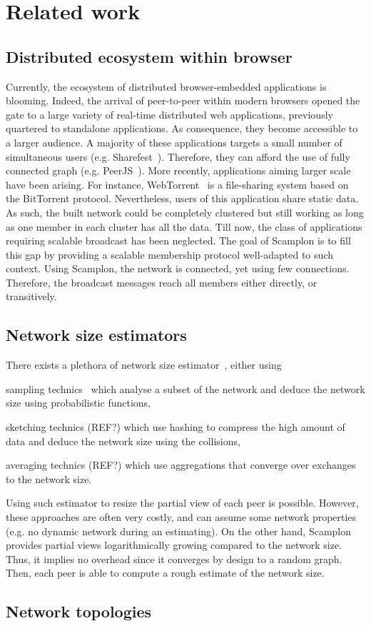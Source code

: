 
\section{Related work}
\label{sec:relatedwork}

\subsection{Distributed ecosystem within browser}
Currently, the ecosystem of distributed browser-embedded applications is
blooming. Indeed, the arrival of peer-to-peer within modern browsers opened the
gate to a large variety of real-time distributed web applications, previously
quartered to standalone applications. As consequence, they become accessible to
a larger audience. A majority of these applications targets a small number of
simultaneous users (e.g. Sharefest~\cite{sharefest}). Therefore, they can
afford the use of fully connected graph (e.g. PeerJS~\cite{peerjs}). More
recently, applications aiming larger scale have been arising. For instance,
WebTorrent~\cite{webtorrent} is a file-sharing system based on the BitTorrent
protocol. Nevertheless, users of this application share static data. As such,
the built network could be completely clustered but still working as long as
one member in each cluster has all the data.  Till now, the class of
applications requiring scalable broadcast has been neglected. The goal of
Scamplon is to fill this gap by providing a scalable membership protocol
well-adapted to such context. Using Scamplon, the network is connected, yet
using few connections. Therefore, the broadcast messages reach all members
either directly, or transitively.


\subsection{Network size estimators}
There exists a plethora of network size
estimator~\cite{kostoulas2007active,baquero2012extrema}, either using
\begin{inparaenum}[(i)]
\item sampling technics~\cite{kostoulas2007active} which analyse a subset of
  the network and deduce the network size using probabilistic functions,
\item sketching technics (REF?) which use hashing to compress the high amount
  of data and deduce the network size using the collisions,
\item averaging technics (REF?) which use aggregations that converge over
  exchanges to the network size.
\end{inparaenum}
Using such estimator to resize the partial view of each peer is
possible. However, these approaches are often very costly, and can assume some
network properties (e.g. no dynamic network during an estimating). On the other
hand, Scamplon provides partial views logarithmically growing compared to the
network size. Thus, it implies no overhead since it converges by design to a
random graph. Then, each peer is able to compute a rough estimate of the
network size.

\subsection{Network topologies}

